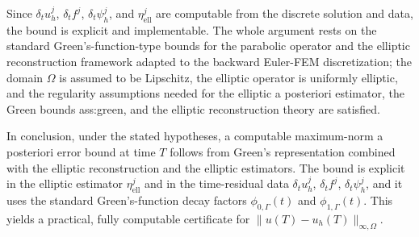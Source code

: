 \documentclass[11pt]{article}
\begin{document}
Since $\delta_t u_h^j$, $\delta_t f^j$, $\delta_t \psi_h^j$, and $\eta^j_{\mathrm{ell}}$ are computable from the discrete solution and data, the bound is explicit and implementable. The whole argument rests on the standard Green's-function-type bounds for the parabolic operator and the elliptic reconstruction framework adapted to the backward Euler-FEM discretization; the domain $\Omega$ is assumed to be Lipschitz, the elliptic operator is uniformly elliptic, and the regularity assumptions needed for the elliptic a posteriori estimator, the Green bounds ass:green, and the elliptic reconstruction theory are satisfied.

In conclusion, under the stated hypotheses, a computable maximum-norm a posteriori error bound at time $T$ follows from Green's representation combined with the elliptic reconstruction and the elliptic estimators. The bound is explicit in the elliptic estimator $\eta^j_{\mathrm{ell}}$ and in the time-residual data $\delta_t u_h^j$, $\delta_t f^j$, $\delta_t \psi_h^j$, and it uses the standard Green's-function decay factors $\phi_{0,\Gamma}(t)$ and $\phi_{1,\Gamma}(t)$. This yields a practical, fully computable certificate for $\|u(T) - u_h(T)\|_{\infty,\Omega}$.
\end{document}
